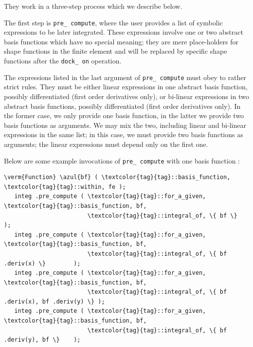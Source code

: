 They work in a three-step process which we describe below.

The first step is {\small\tt pre\_\,compute}, where the user provides a list of symbolic
expressions to be later integrated.
These expressions involve one or two abstract basis functions which have no special meaning;
they are mere place-holders for shape functions in the finite element and will be replaced
by specific shape functions after the {\small\tt dock\_\,on} operation.

The expressions listed in the last argument of {\small\tt pre\_\,compute} must obey to
rather strict rules.
They must be either linear expressions in one abstract basis function, possibly differentiated
(first order derivatives only), or bi-linear expressions in two abstract basis functions,
possibly differentiated (first order derivatives only).
In the former case, we only provide one basis function, in the latter we provide two basis
functions as arguments.
We may mix the two, including linear and bi-linear expressions in the same list;
in this case, we must provide two basis functions as arguments;
the linear expressions must depend only on the first one.

Below are some example invocations of {\small\tt pre\_\,compute} with one basis function :
\begin{Verbatim}[commandchars=\\\{\},formatcom=\small\tt,
   baselinestretch=0.94,framesep=2mm                      ]
   \verm{Function} \azul{bf} ( \textcolor{tag}{tag}::basis_function, \textcolor{tag}{tag}::within, fe );
   integ .pre_compute ( \textcolor{tag}{tag}::for_a_given, \textcolor{tag}{tag}::basis_function, bf,
                        \textcolor{tag}{tag}::integral_of, \{ bf \}                  );
   integ .pre_compute ( \textcolor{tag}{tag}::for_a_given, \textcolor{tag}{tag}::basis_function, bf,
                        \textcolor{tag}{tag}::integral_of, \{ bf .deriv(x) \}        );
   integ .pre_compute ( \textcolor{tag}{tag}::for_a_given, \textcolor{tag}{tag}::basis_function, bf,
                        \textcolor{tag}{tag}::integral_of, \{ bf .deriv(x), bf .deriv(y) \} );
   integ .pre_compute ( \textcolor{tag}{tag}::for_a_given, \textcolor{tag}{tag}::basis_function, bf,
                        \textcolor{tag}{tag}::integral_of, \{ bf .deriv(y), bf \}    );
\end{Verbatim}

